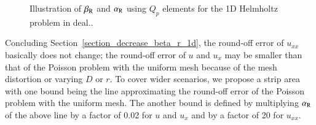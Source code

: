 \documentclass[review,3p]{elsarticle}
\begin{document}
\begin{figure}[!ht]
\caption{Illustration of $\beta_{\rm R}$ and $\alpha_{\rm R}$ using $Q_p$ elements for the 1D Helmholtz problem in deal..}
\label{alpha_R_beta_R_mesh_2_helm_1_u_exp_m_x_m_0p5_square_0_sm}
\end{figure}

\newpage
Concluding Section~\ref{section_decrease_beta_r_1d}, the round-off error of $u_{xx}$ basically does not change; the round-off error of $u$ and $u_x$ may be smaller than that of the Poisson problem with the uniform mesh because of the mesh distortion or varying $D$ or $r$. To cover wider scenarios, we propose a strip area with one bound being the line approximating the round-off error of the Poisson problem with the uniform mesh. The another bound is defined by multiplying $\alpha_{\rm R} $ of the above line by a factor of 0.02 for $u$ and $u_x$ and by a factor of 20 for $u_{xx}$.
\end{document}
